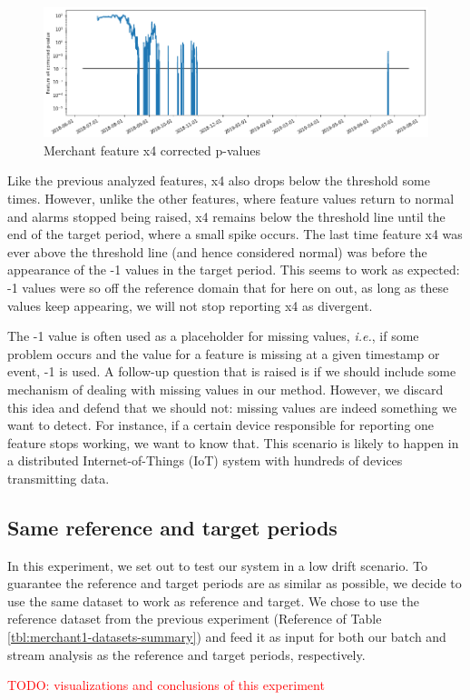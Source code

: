 \begin{figure}[!htb]
    \begin{center}
      \includegraphics[scale=0.5]{figures/merchant-x4-correctedpvalues.png}
      \caption{Merchant feature x4 corrected p-values}
      \label{fig:merchant-x4-correctedpvalues}
    \end{center}
\end{figure}
Like the previous analyzed features, x4 also drops below the threshold some times. However, unlike the other features, where feature values return to normal and alarms stopped being raised, x4 remains below the threshold line until the end of the target period, where a small spike occurs. The last time feature x4 was ever above the threshold line (and hence considered normal) was before the appearance of the -1 values in the target period. This seems to work as expected: -1 values were so off the reference domain that for here on out, as long as these values keep appearing, we will not stop reporting x4 as divergent.

The -1 value is often used as a placeholder for missing values, \textit{i.e.}, if some problem occurs and the value for a feature is missing at a given timestamp or event, -1 is used. A follow-up question that is raised is if we should include some mechanism of dealing with missing values in our method. However, we discard this idea and defend that we should not: missing values are indeed something we want to detect. For instance, if a certain device responsible for reporting one feature stops working, we want to know that. This scenario is likely to happen in a distributed Internet-of-Things (IoT) system with hundreds of devices transmitting data. 

\subsection{Same reference and target periods}
In this experiment, we set out to test our system in a low drift scenario. To guarantee the reference and target periods are as similar as possible, we decide to use the same dataset to work as reference and target. We chose to use the reference dataset from the previous experiment (Reference of Table \ref{tbl:merchant1-datasets-summary}) and feed it as input for both our batch and stream analysis as the reference and target periods, respectively.


\textcolor{red}{TODO: visualizations and conclusions of this experiment}